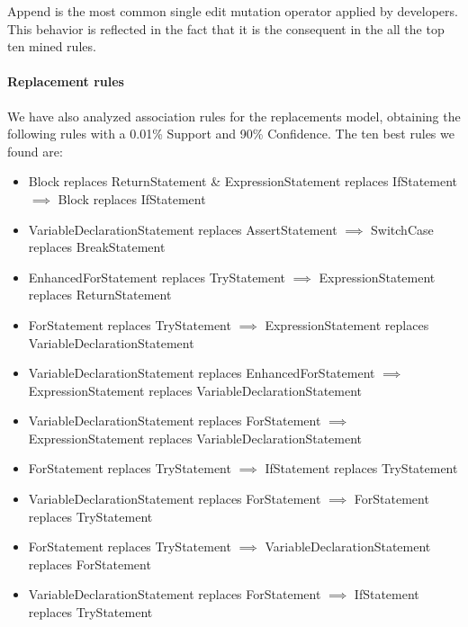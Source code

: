 \documentclass[conference]{IEEEtran}
\begin{document}
Append is the most common single edit mutation operator applied by developers. This behavior is
reflected in the fact that it is the consequent in the all the top ten mined
rules.  

\paragraph {Replacement rules} We have also analyzed association rules for the
replacements model, obtaining
the following rules with a 0.01\% Support and 90\% Confidence.
The ten best rules we found are:
\begin{itemize}
\item Block replaces ReturnStatement \& ExpressionStatement replaces IfStatement $\implies$ Block replaces IfStatement
\item VariableDeclarationStatement replaces AssertStatement $\implies$ SwitchCase replaces BreakStatement
\item EnhancedForStatement replaces TryStatement $\implies$ ExpressionStatement replaces ReturnStatement
\item ForStatement replaces TryStatement $\implies$ ExpressionStatement replaces VariableDeclarationStatement
\item VariableDeclarationStatement replaces EnhancedForStatement $\implies$ ExpressionStatement replaces VariableDeclarationStatement
\item VariableDeclarationStatement replaces ForStatement $\implies$ ExpressionStatement replaces VariableDeclarationStatement
\item ForStatement replaces TryStatement $\implies$ IfStatement replaces TryStatement
\item VariableDeclarationStatement replaces ForStatement $\implies$ ForStatement replaces TryStatement
\item ForStatement replaces TryStatement $\implies$ VariableDeclarationStatement replaces ForStatement
\item VariableDeclarationStatement replaces ForStatement $\implies$ IfStatement replaces TryStatement
\end{itemize}

\end{document}
